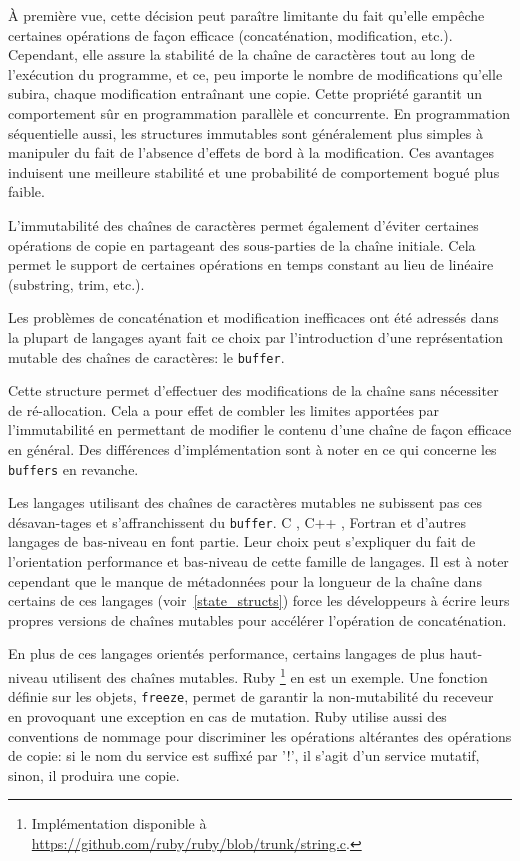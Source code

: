 À première vue, cette décision peut paraître limitante du fait qu'elle
empêche certaines opérations de façon efficace (concaténation,
modification, etc.). Cependant, elle assure la stabilité de la chaîne
de caractères tout au long de l'exécution du programme, et ce, peu importe le
nombre de modifications qu'elle subira, chaque modification entraînant une copie.
Cette propriété garantit un comportement sûr en programmation parallèle et concurrente.
En programmation séquentielle aussi, les structures immutables sont
généralement plus simples à manipuler du fait de l'absence d'effets de
bord à la modification.
Ces avantages induisent une meilleure stabilité et une probabilité de
comportement bogué plus faible.

L'immutabilité des chaînes de caractères permet également d'éviter
certaines opérations de copie en partageant des sous-parties de la
chaîne initiale.
Cela permet le support de certaines opérations
en temps constant au lieu de linéaire (substring, trim, etc.).

Les problèmes de concaténation et modification inefficaces ont été adressés
dans la plupart de langages ayant fait ce choix par l'introduction d'une
représentation mutable des chaînes de caractères: le \texttt{buffer}.

Cette structure permet d'effectuer des modifications
de la chaîne sans nécessiter de ré-allocation.
Cela a pour effet de combler les limites
apportées par l'immutabilité en permettant de modifier le contenu d'une
chaîne de façon efficace en général.
Des différences d'implémentation sont à noter en ce qui concerne les \texttt{buffers} en revanche.

Les langages utilisant des chaînes de caractères mutables ne subissent pas ces
désavan-tages et s'affranchissent du \texttt{buffer}.
C \cite{cspec}, C++ \cite{cppspec}, Fortran \cite{fortranspec} et d'autres langages
de bas-niveau en font partie.
Leur choix peut s'expliquer du fait de l'orientation performance et bas-niveau
de cette famille de langages.
Il est à noter cependant que le manque de métadonnées pour la longueur
de la chaîne dans certains de ces langages (voir~\ref{state_structs}) force les développeurs
à écrire leurs propres versions de chaînes mutables pour accélérer l'opération
de concaténation.

En plus de ces langages orientés performance, certains langages de plus haut-niveau utilisent
des chaînes mutables.
Ruby \cite{rubyref}\footnote{Implémentation disponible à
\url{https://github.com/ruby/ruby/blob/trunk/string.c}.} en est un exemple.
Une fonction définie sur les objets, \texttt{freeze}, permet de garantir la non-mutabilité
du receveur en provoquant une exception en cas de mutation.
Ruby utilise aussi des conventions de nommage pour discriminer les opérations altérantes
des opérations de copie: si le nom du service est suffixé par '!', il s'agit d'un service
mutatif, sinon, il produira une copie.

